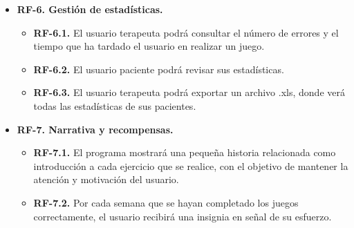 \begin{itemize}
    \item \textbf{RF-6. Gestión de estadísticas.}
    \begin{itemize}
        \item \textbf{RF-6.1.} El usuario terapeuta podrá consultar el número de errores y el tiempo que ha tardado el usuario en realizar un juego.
        \item \textbf{RF-6.2.} El usuario paciente podrá revisar sus estadísticas.
        \item \textbf{RF-6.3.} El usuario terapeuta podrá exportar un archivo .xls, donde verá todas las estadísticas de sus pacientes.
    \end{itemize}
    
    \item \textbf{RF-7. Narrativa y recompensas.}
    \begin{itemize}
        \item \textbf{RF-7.1.} El programa mostrará una pequeña historia relacionada como introducción a cada ejercicio que se realice, con el objetivo de mantener la atención y motivación del usuario.
        \item \textbf{RF-7.2.} Por cada semana que se hayan completado los juegos correctamente, el usuario recibirá una insignia en señal de su esfuerzo.
    \end{itemize}

\end{itemize}


